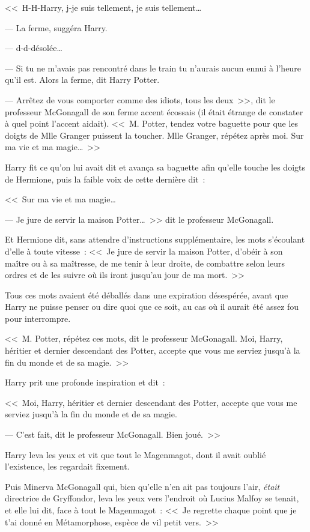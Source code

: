 <<~H-H-Harry, j-je suis tellement, je suis tellement…

--- La ferme, suggéra Harry.

--- d-d-désolée…

--- Si tu ne m'avais pas rencontré dans le train tu n'aurais aucun ennui à l'heure qu'il est. Alors la ferme, dit Harry Potter.

--- Arrêtez de vous comporter comme des idiots, tous les deux~>>, dit le professeur McGonagall de son ferme accent écossais (il était étrange de constater à quel point l'accent aidait). <<~M. Potter, tendez votre baguette pour que les doigts de Mlle Granger puissent la toucher. Mlle Granger, répétez après moi. Sur ma vie et ma magie…~>>

Harry fit ce qu'on lui avait dit et avança sa baguette afin qu'elle touche les doigts de Hermione, puis la faible voix de cette dernière dit~:

<<~Sur ma vie et ma magie…

--- Je jure de servir la maison Potter…~>> dit le professeur McGonagall.

Et Hermione dit, sans attendre d'instructions supplémentaire, les mots s'écoulant d'elle à toute vitesse~: <<~Je jure de servir la maison Potter, d'obéir à son maître ou à sa maîtresse, de me tenir à leur droite, de combattre selon leurs ordres et de les suivre où ils iront jusqu'au jour de ma mort.~>>

Tous ces mots avaient été déballés dans une expiration désespérée, avant que Harry ne puisse penser ou dire quoi que ce soit, au cas où il aurait été assez fou pour interrompre.

<<~M. Potter, répétez ces mots, dit le professeur McGonagall. Moi, Harry, héritier et dernier descendant des Potter, accepte que vous me serviez jusqu'à la fin du monde et de sa magie.~>>

Harry prit une profonde inspiration et dit~:

<<~Moi, Harry, héritier et dernier descendant des Potter, accepte que vous me serviez jusqu'à la fin du monde et de sa magie.

--- C'est fait, dit le professeur McGonagall. Bien joué.~>>

Harry leva les yeux et vit que tout le Magenmagot, dont il avait oublié l'existence, les regardait fixement.

Puis Minerva McGonagall qui, bien qu'elle n'en ait pas toujours l'air, \emph{était} directrice de Gryffondor, leva les yeux vers l'endroit où Lucius Malfoy se tenait, et elle lui dit, face à tout le Magenmagot~: <<~Je regrette chaque point que je t'ai donné en Métamorphose, espèce de vil petit vers.~>>

